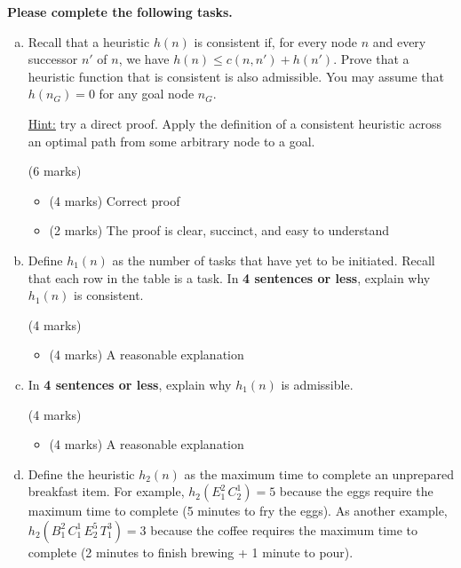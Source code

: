\documentclass[12pt]{article}
\begin{document}
{\bf Please complete the following tasks.}

\begin{enumerate}[(a)]

\item
\label{proof}
Recall that a heuristic $h(n)$ is consistent if, for every node $n$ and every successor $n'$ of $n$, we have $h(n) \leq c(n, n') + h(n')$. Prove that a heuristic function that is consistent is also admissible. You may assume that $h(n_G) = 0$ for any goal node $n_G$.

\underline{Hint:} try a direct proof. Apply the definition of a consistent heuristic across an optimal path from some arbitrary node to a goal.


\begin{markscheme} (6 marks)
\begin{itemize}
\item
(4 marks) Correct proof
\item
(2 marks) The proof is clear, succinct, and easy to understand
\end{itemize}

\end{markscheme}


\item
\label{admissible-heuristic}
Define $h_1(n)$ as the number of tasks that have yet to be initiated. Recall that each row in the table is a task. In \textbf{4 sentences or less}, explain why $h_1(n)$ is consistent.

\begin{markscheme} (4 marks)
\begin{itemize}
\item
(4 marks) A reasonable explanation
\end{itemize}

\end{markscheme}


\item
\label{consistent-heuristic}
In \textbf{4 sentences or less}, explain why $h_1(n)$ is admissible.

\begin{markscheme} (4 marks)
\begin{itemize}
\item
(4 marks) A reasonable explanation
\end{itemize}

\end{markscheme}


\item
\label{domination}
Define the heuristic $h_2(n)$ as the maximum time to complete an unprepared breakfast item. 
For example, $h_2(E_1^2\,C_2^1) = 5$ because the eggs require the maximum time to complete (5 minutes to fry the eggs). As another example, $h_2(B_1^2\,C_1^1\,E_2^5\,T_1^3) = 3$ because the coffee requires the maximum time to complete (2 minutes to finish brewing + 1 minute to pour).


\end{enumerate}
\end{document}
